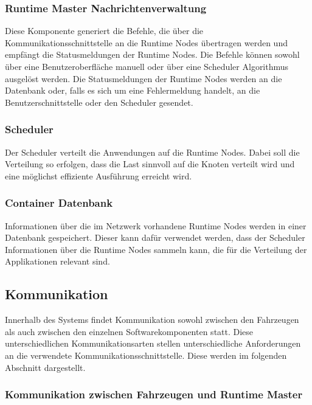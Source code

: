 \subsubsection{Runtime Master Nachrichtenverwaltung}

Diese Komponente generiert die Befehle, die über die Kommunikationsschnittstelle an die Runtime Nodes übertragen werden und empfängt die Statusmeldungen der Runtime Nodes. Die Befehle können sowohl über eine Benutzeroberfläche manuell oder über eine Scheduler Algorithmus ausgelöst werden. Die Statusmeldungen der Runtime Nodes werden an die Datenbank oder, falls es sich um eine Fehlermeldung handelt, an die Benutzerschnittstelle oder den Scheduler gesendet. 

\subsubsection{Scheduler}

Der Scheduler verteilt die Anwendungen auf die Runtime Nodes. Dabei soll die Verteilung so erfolgen, dass die Last sinnvoll auf die Knoten verteilt wird und eine möglichst effiziente Ausführung erreicht wird. 

\subsubsection{Container Datenbank}

 Informationen über die im Netzwerk vorhandene Runtime Nodes werden in einer Datenbank gespeichert. Dieser kann dafür verwendet werden, dass der Scheduler Informationen über die Runtime Nodes sammeln kann, die für die Verteilung der Applikationen relevant sind. 

\subsection{Kommunikation}

Innerhalb des Systems findet Kommunikation sowohl zwischen den Fahrzeugen als auch zwischen den einzelnen Softwarekomponenten statt. Diese unterschiedlichen Kommunikationsarten stellen unterschiedliche Anforderungen an die verwendete Kommunikationsschnittstelle. Diese werden im folgenden Abschnitt dargestellt.

\subsubsection{Kommunikation zwischen Fahrzeugen und Runtime Master}

